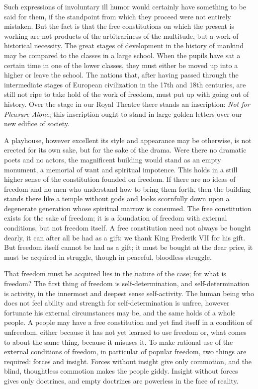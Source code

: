 \documentclass[12pt,a4paper,openany]{book}
\newcommand{\opage}[1]{\marginnote{\footnotesize\textit{[#1]}}}
\begin{document}
\setcounter{footnote}{0}%
\opage{57}Such expressions of involuntary ill humor would
certainly have something to be said for them, if the standpoint
from which they proceed were not entirely mistaken. But
the fact is that the free constitutions on which the present
is working are not products of the arbitrariness of the multitude,
but a work of historical necessity.
The great stages of development in the history of mankind
may be compared to the classes in a large school.
When the pupils have sat a certain time in one of the lower
classes, they must either be moved up into a higher or leave
the school. The nations that, after having passed through
the intermediate stages of European civilization in the
17th and 18th centuries, are still not ripe
to take hold of the work of freedom, must put up with
going out of history. Over the stage in
our Royal Theatre there stands an inscription: \emph{Not for Pleasure Alone};
this inscription ought to stand in large golden letters
over our new edifice of society.

A playhouse, however excellent its style and appearance may be
otherwise, is not erected for its own
sake, but for the sake of the drama. Were there no
dramatic poets and no actors, the
magnificent building would stand as an empty monument, a
memorial of want and spiritual impotence. This holds in a
still higher sense of the constitution founded on freedom.
If there are no ideas of freedom and no men
who understand how to bring them forth, then the building stands
there like a temple without gods and looks scornfully down
upon a degenerate generation whose spiritual marrow is consumed.
The free constitution exists for the sake of freedom; it is
a foundation of freedom with external conditions, but not
freedom itself. A free constitution need not always
\setcounter{footnote}{0}%
\opage{58}be bought dearly, it can after all be had as a gift: we
thank King Frederik VII for his gift. But freedom
itself cannot be had as a gift; it must be bought at
the dear price, it must be acquired in struggle, though in
peaceful, bloodless struggle.

That freedom must be acquired lies in the nature of the case;
for what is freedom? The first thing of freedom is self-determination,
and self-determination is activity, in the innermost
and deepest sense self-activity. The human being
who does not feel ability and strength for self-determination is
unfree, however fortunate his external circumstances may be, and the
same holds of a whole people. A people may have
a free constitution and yet find itself in a condition
of unfreedom, either because it has not yet learned to
use freedom or, what comes to about the same thing,
because it misuses it. To make rational use
of the external conditions of freedom, in particular of popular freedom,
two things are required: forces and
insight. Forces without insight give only commotion, and the
blind, thoughtless commotion makes the people giddy. Insight
without forces gives only doctrines, and empty doctrines %
are powerless in the face of reality.
\end{document}

